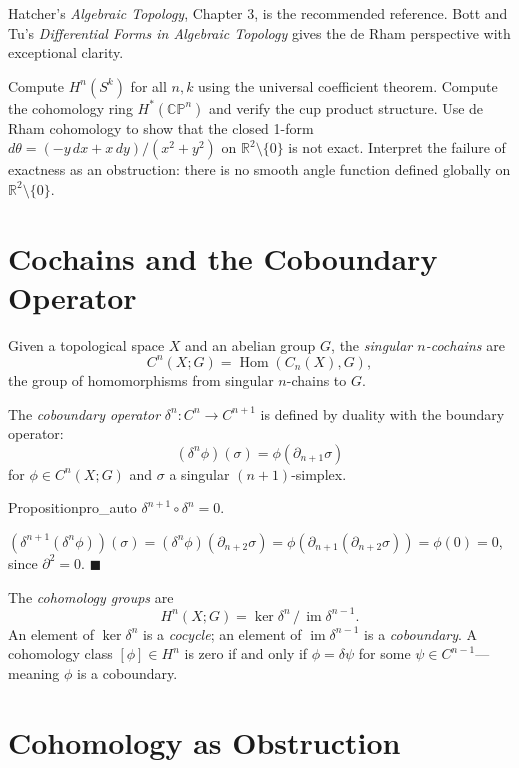\documentclass[12pt, twoside, openright, a4paper]{book}
\renewenvironment{proof}{%
  \par\medskip\noindent{\color{RSVPgreen}\bfseries\sffamily Proof.}\enspace\ignorespaces
}{\hfill{\color{RSVPgreen}$\blacksquare$}\par\medskip}
\newcommand{\R}{\mathbb{R}}
\DeclareMathOperator{\im}{im}
\newcommand{\Hom}{\operatorname{Hom}}
\begin{document}
\begin{exercises_box}
Hatcher's \textit{Algebraic Topology}, Chapter 3, is the recommended reference.
Bott and Tu's \textit{Differential Forms in Algebraic Topology} gives the de Rham perspective with exceptional clarity.

Compute $H^n(S^k)$ for all $n, k$ using the universal coefficient theorem.
Compute the cohomology ring $H^*(\mathbb{CP}^n)$ and verify the cup product structure.
Use de Rham cohomology to show that the closed 1-form $d\theta = (-y\,dx + x\,dy)/(x^2+y^2)$ on $\R^2 \setminus \{0\}$ is not exact.
Interpret the failure of exactness as an obstruction: there is no smooth angle function defined globally on $\R^2 \setminus \{0\}$.
\end{exercises_box}

\section{Cochains and the Coboundary Operator}

Given a topological space $X$ and an abelian group $G$, the \emph{singular $n$-cochains} are
\[C^n(X; G) = \Hom(C_n(X), G),\]
the group of homomorphisms from singular $n$-chains to $G$.

The \emph{coboundary operator} $\delta^n: C^n \to C^{n+1}$ is defined by duality with the boundary operator:
\[(\delta^n \phi)(\sigma) = \phi(\partial_{n+1} \sigma)\]
for $\phi \in C^n(X;G)$ and $\sigma$ a singular $(n+1)$-simplex.

\begin{proposition}{Proposition}{pro_auto}
$\delta^{n+1} \circ \delta^n = 0$.
\end{proposition}
\begin{proof}
$(\delta^{n+1}(\delta^n\phi))(\sigma) = (\delta^n\phi)(\partial_{n+2}\sigma) = \phi(\partial_{n+1}(\partial_{n+2}\sigma)) = \phi(0) = 0$,
since $\partial^2 = 0$.
\end{proof}

The \emph{cohomology groups} are
\[H^n(X; G) = \ker\delta^n \,/\, \im\delta^{n-1}.\]
An element of $\ker\delta^n$ is a \emph{cocycle}; an element of $\im\delta^{n-1}$ is a \emph{coboundary}.
A cohomology class $[\phi] \in H^n$ is zero if and only if $\phi = \delta\psi$ for some $\psi \in C^{n-1}$---meaning $\phi$ is a coboundary.

\section{Cohomology as Obstruction}
\end{document}

